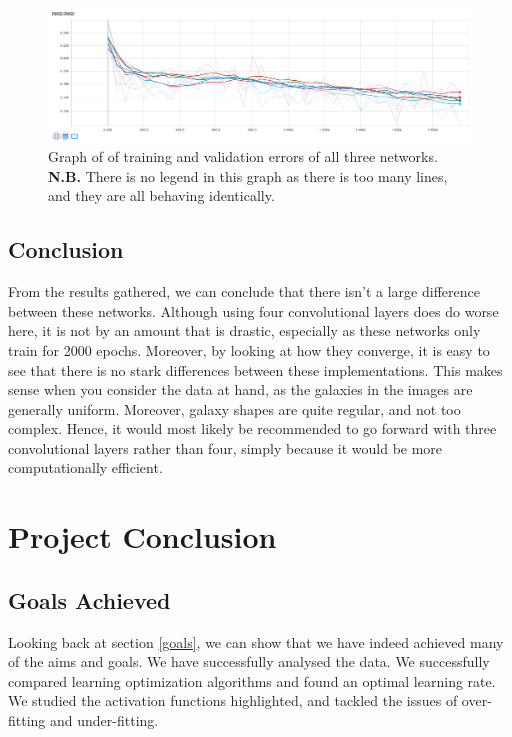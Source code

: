 \documentclass[12pt,a4paper,oneside,oldfontcommands]{memoir}
\begin{document}
\begin{Declaration Of OriginalityOrginality}
\begin{figure}[H]
  \centering
    \includegraphics[width=\linewidth]{images/convgraph.png}
    \caption{Graph of of training and validation errors of all three networks. \textbf{N.B.} There is no legend in this graph as there is too many lines, and they are all behaving identically.}
      \label{fig:conv-graph}
\end{figure}

\section{Conclusion}

From the results gathered, we can conclude that there isn't a large difference between these networks. Although using four convolutional layers does do worse here, it is not by an amount that is drastic, especially as these networks only train for 2000 epochs. Moreover, by looking at how they converge, it is easy to see that there is no stark differences between these implementations. This makes sense when you consider the data at hand, as the galaxies in the images are generally uniform. Moreover, galaxy shapes are quite regular, and not too complex. Hence, it would most likely be recommended to go forward with three convolutional layers rather than four, simply because it would be more computationally efficient.

\chapter{Project Conclusion}


\section{Goals Achieved}

Looking back at section \ref{goals}, we can show that we have indeed achieved many of the aims and goals. We have successfully analysed the data. We successfully compared learning optimization algorithms and found an optimal learning rate. We studied the activation functions highlighted, and tackled the issues of over-fitting and under-fitting. 


\end{Declaration Of OriginalityOrginality}
\end{document}
